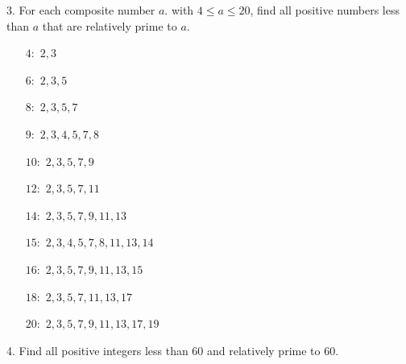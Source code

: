 \newpage
\begin{mdframed}[style=darkQuesion]
3. For each composite number $a$. with $4\leq a\leq 20$, find all positive 
numbers less than $a$ that are relatively prime to $a$.
\end{mdframed}

\begin{mdframed}[style=darkAnswer,frametitle={Joe Starr}]
\begin{multicols}{1}
\begin{itemize}
    \item[$4:$]  {$2, 3$}
    \item[$6:$]  {$2, 3, 5$}
    \item[$8:$]  {$2, 3, 5, 7$}
    \item[$9:$]  {$2, 3, 4, 5, 7, 8$}
    \item[$10:$] {$2, 3, 5, 7, 9$}
    \item[$12:$] {$2, 3, 5, 7, 11$}
    \item[$14:$] {$2, 3, 5, 7, 9, 11, 13$}
    \item[$15:$] {$2, 3, 4, 5, 7, 8, 11, 13, 14$}
    \item[$16:$] {$2, 3, 5, 7, 9, 11, 13, 15$}
    \item[$18:$] {$2, 3, 5, 7, 11, 13, 17$}
    \item[$20:$] {$2, 3, 5, 7, 9, 11, 13, 17, 19$}
\end{itemize}
\end{multicols}
\end{mdframed}
\newpage
\begin{mdframed}[style=darkQuesion]
4. Find all positive integers less than 60 and relatively prime to $60$.
\end{mdframed}

